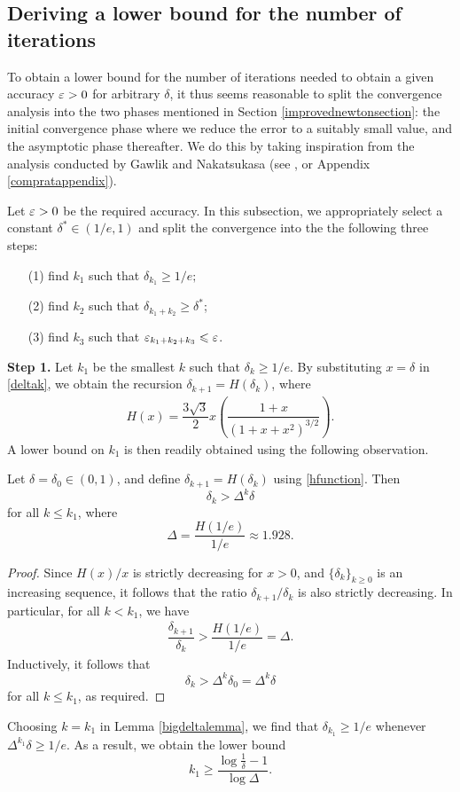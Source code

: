 \subsection{Deriving a lower bound for the number of iterations}

To obtain a lower bound for the number of iterations needed to obtain a given accuracy $\varepsilon>0$ for arbitrary $\delta$, it thus seems reasonable to split the convergence analysis into the two phases mentioned in Section \ref{improvednewtonsection}: the initial convergence phase where we reduce the error to a suitably small value, and the asymptotic phase thereafter. We do this by taking inspiration from the analysis conducted by Gawlik and Nakatsukasa (see \cite{Yuji}, or Appendix \ref{compratappendix}).

\bigskip{}

Let $\varepsilon>0$ be the required accuracy. In this subsection, we appropriately select a constant $\delta^* \in (1/e,1)$ and split the convergence into the the following three steps:
\begin{enumerate}
    \item[(1)] find $k_1$ such that $\delta_{k_1} \geq 1/e;$
    \item[(2)] find $k_2$ such that $\delta_{k_1+k_2} \geq \delta^*$;
    \item[(3)] find $k_3$ such that $\varepsilon_{k_1+k_2+k_3} \leqslant \varepsilon$.
\end{enumerate}

\textbf{Step 1.} Let $k_1$ be the smallest $k$ such that $\delta_k \geq 1/e$. By substituting $x=\delta$ in \eqref{deltak}, we obtain the recursion $\delta_{k+1}=H(\delta_k)$, where
\begin{align}
H(x)=\dfrac{3\sqrt{3}}{2}x\left(\dfrac{1+x}{(1+x+x^2)^{3/2}}\right). \label{hfunction}
\end{align}
A lower bound on $k_1$ is then readily obtained using the following observation.

\begin{lemma}\label{bigdeltalemma}
Let $\delta=\delta_0\in(0,1)$, and define $\delta_{k+1}=H(\delta_k)$ using \eqref{hfunction}. Then
\[\delta_k > \Delta^k \delta\]
for all $k\leq k_1$, where
\[\Delta = \dfrac{H(1/e)}{1/e}\approx 1.928.\]
\end{lemma}

\begin{proof}
Since $H(x)/x$ is strictly decreasing for $x>0$, and $\{\delta_k\}_{k\geq 0}$ is an increasing sequence, it follows that the ratio $\delta_{k+1}/\delta_k$ is also strictly decreasing. In particular, for all $k < k_1$, we have
\begin{align*}
    \dfrac{\delta_{k+1}}{\delta_k}> \dfrac{H(1/e)}{1/e}=\Delta.
\end{align*}
Inductively, it follows that
\[\delta_{k}  >\Delta^{k}\delta_0 = \Delta^{k}\delta\]
for all $k \leq k_1$, as required.
\end{proof}
Choosing $k=k_1$ in Lemma \ref{bigdeltalemma}, we find that $\delta_{k_1}\geq 1/e$ whenever $\Delta^{k_1}\delta\geq 1/e$. As a result, we obtain the lower bound
\[k_1 \geq \dfrac{\log \frac{1}{\delta}-1}{\log\Delta}.\]

